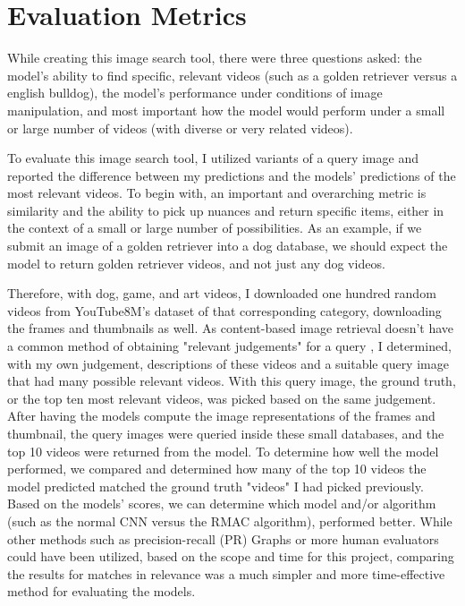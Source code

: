 \documentclass[10pt,twocolumn]{article}
\begin{document}

\section{Evaluation Metrics}

While creating this image search tool, there were three questions asked: the model's ability to find specific, relevant videos (such as a golden retriever versus a english bulldog), the model's performance under conditions of image manipulation, and most important how the model would perform under a small or large number of videos (with diverse or very related videos).

To evaluate this image search tool, I utilized variants of a query image and reported the difference between my predictions and the models' predictions of the most relevant videos. To begin with, an important and overarching metric is similarity and the ability to pick up nuances and return specific items, either in the context of a small or large number of possibilities. As an example, if we submit an image of a golden retriever into a dog database, we should expect the model to return golden retriever videos, and not just any dog videos.

Therefore, with dog, game, and art videos, I downloaded one hundred random videos from YouTube8M's dataset of that corresponding category, downloading the frames and thumbnails as well. As content-based image retrieval doesn't have a common method of obtaining "relevant judgements" for a query \cite{Muller2001}, I determined, with my own judgement, descriptions of these videos and a suitable query image that had many possible relevant videos. With this query image, the ground truth, or the top ten most relevant videos, was picked based on the same judgement. After having the models compute the image representations of the frames and thumbnail, the query images were queried inside these small databases, and the top 10 videos were returned from the model. To determine how well the model performed, we compared and determined how many of the top 10 videos the model predicted matched the ground truth "videos" I had picked previously. Based on the models' scores, we can determine which model and/or algorithm (such as the normal CNN versus the RMAC algorithm), performed better. While other methods such as precision-recall (PR) Graphs \cite{Muller2001} or more human evaluators could have been utilized, based on the scope and time for this project, comparing the results for matches in relevance was a much simpler and more time-effective method for evaluating the models.
\end{document}
